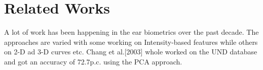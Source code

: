 \chapter{Related Works}
\label{sec:related}

A lot of work has been happening in the ear biometrics over the past decade. The approaches are varied with some working on Intensity-based features while others on 2-D ad 3-D curves etc. Chang et al.[2003] whole worked on the UND database and got an accuracy of 72.7p.c. using the PCA approach.

